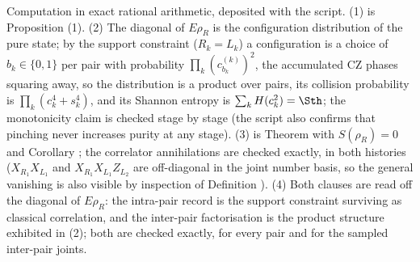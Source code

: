 Computation in exact rational arithmetic, deposited with the script. (1) is Proposition (1). (2) The diagonal of $E\rho_R$ is the configuration distribution of the pure state; by the support constraint ($R_k = L_k$) a configuration is a choice of $b_k \in \{0,1\}$ per pair with probability $\prod_k (c^{(k)}_{b_k})^2$, the accumulated CZ phases squaring away, so the distribution is a product over pairs, its collision probability is $\prod_k (c_k^4 + s_k^4)$, and its Shannon entropy is $\sum_k H(c_k^2) = \Sth$; the monotonicity claim is checked stage by stage (the script also confirms that pinching never increases purity at any stage). (3) is Theorem  with $S(\rho_R) = 0$ and Corollary ; the correlator annihilations are checked exactly, in both histories ($X_{R_1}X_{L_1}$ and $X_{R_1}X_{L_1}Z_{L_2}$ are off-diagonal in the joint number basis, so the general vanishing is also visible by inspection of Definition ). (4) Both clauses are read off the diagonal of $E\rho_R$: the intra-pair record is the support constraint surviving as classical correlation, and the inter-pair factorisation is the product structure exhibited in (2); both are checked exactly, for every pair and for the sampled inter-pair joints.
